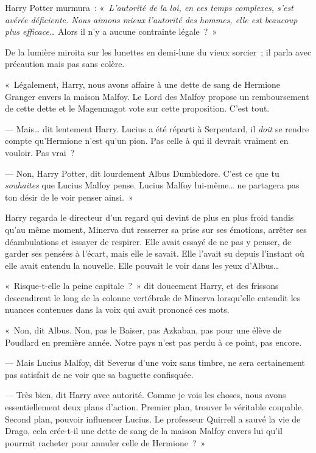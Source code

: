 Harry Potter murmura~: «~\emph{L'autorité de la loi, en ces temps complexes, s'est avérée déficiente.
Nous aimons mieux l'autorité des hommes, elle est beaucoup plus efficace…} Alors il n'y a aucune contrainte légale~?~»

De la lumière miroita sur les lunettes en demi-lune du vieux sorcier~; il parla avec précaution mais pas sans colère.

«~Légalement, Harry, nous avons affaire à une dette de sang de Hermione Granger envers la maison Malfoy.
Le Lord des Malfoy propose un remboursement de cette dette et le Magenmagot vote sur cette proposition.
C'est tout.

--- Mais… dit lentement Harry.
Lucius a été réparti à Serpentard, il \emph{doit} se rendre compte qu'Hermione n'est qu'un pion.
Pas celle à qui il devrait vraiment en vouloir.
Pas vrai~?

--- Non, Harry Potter, dit lourdement Albus Dumbledore.
C'est ce que tu \emph{souhaites} que Lucius Malfoy pense.
Lucius Malfoy lui-même… ne partagera pas ton désir de le voir penser ainsi.~»

Harry regarda le directeur d'un regard qui devint de plus en plus froid tandis qu'au même moment, Minerva dut resserrer sa prise sur ses émotions, arrêter ses déambulations et essayer de respirer.
Elle avait essayé de ne pas y penser, de garder ses pensées à l'écart, mais elle le savait.
Elle l'avait su depuis l'instant où elle avait entendu la nouvelle.
Elle pouvait le voir dans les yeux d'Albus…

«~Risque-t-elle la peine capitale~?~»
dit doucement Harry, et des frissons descendirent le long de la colonne vertébrale de Minerva lorsqu'elle entendit les nuances contenues dans la voix qui avait prononcé ces mots.

«~Non, dit Albus.
Non, pas le Baiser, pas Azkaban, pas pour une élève de Poudlard en première année.
Notre pays n'est pas perdu à ce point, pas encore.

--- Mais Lucius Malfoy, dit Severus d'une voix sans timbre, ne sera certainement pas satisfait de ne voir que sa baguette confisquée.

--- Très bien, dit Harry avec autorité.
Comme je vois les choses, nous avons essentiellement deux plans d'action.
Premier plan, trouver le véritable coupable.
Second plan, pouvoir influencer Lucius.
Le professeur Quirrell a sauvé la vie de Drago, cela crée-t-il une dette de sang de la maison Malfoy envers lui qu'il pourrait racheter pour annuler celle de Hermione~?~»

